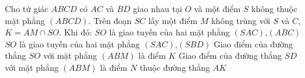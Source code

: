 \begin{ex}%
Cho tứ giác $ ABCD$ có $ AC$ và $ BD$ giao nhau tại $ O$ và một điểm $ S$ không thuộc mặt phẳng $ (ABCD)$. Trên đoạn $ SC$ lấy một điểm $ M$ không trùng với $ S$ và $ C$,$ K=AM\cap SO$. Khi đó:
	\choiceTF
	{$ SO$ là giao tuyến của hai mặt phẳng $\left(SAC\right)$,$ (ABC)$}
	{\True $ SO$ là giao tuyến của hai mặt phẳng $\left(SAC\right)$,$ (SBD)$}
	{\True Giao điểm của đường thẳng $ SO$ với mặt phẳng $ (ABM)$ là điểm $ K$}
	{Giao điểm của đường thẳng $ SD$ với mặt phẳng $ (ABM)$ là điểm $ N$ thuộc đường thẳng $ AK$}
\end{ex}
